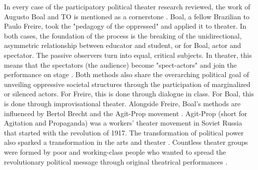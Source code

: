 \documentclass[dissertation,math,vertlayout,pdfa,colorlinks]{aaltoseries}
\begin{document}
In every case of the participatory political theater research reviewed, the work of Augusto Boal and TO \cite{boalTheatreOppressed2008} is mentioned as a cornerstone \cite{pierseCreativelyConnectingCivil2020,epskampTheatreDevelopmentIntroduction2006, tselikaConflictTransformationArt2019, matarassoRestlessArt2019}. Boal, a fellow Brazilian to Paulo Freire, took the "pedagogy of the oppressed" and applied it to theater. In both cases, the foundation of the process is the breaking of the unidirectional, asymmetric relationship between educator and student, or for Boal, actor and spectator. The passive observers turn into equal, critical subjects.  In theater, this means that the spectators (the audience) become "spect-actors" and join the performance on stage \cite{boalTheatreOppressed2008}. Both methods also share the overarching political goal of unveiling oppressive societal structures through the participation of marginalized or silenced actors. For Freire, this is done through dialogue in class. For Boal, this is done through improvisational theater. Alongside Freire, Boal's methods are influenced by Bertol Brecht and the Agit-Prop movement \cite[p.91]{friedmanPerformanceActivismPrecursors2021}. Agit-Prop (short for Agitation
and Propaganda) was a workers' theater movement in Soviet Russia that started with the revolution of 1917. The transformation of political power also sparked a transformation in the arts and theater \cite[p.97]{fischer-lichteTheatreSacrificeRitual2007}. Countless theater groups were formed by poor and working-class people who wanted to spread the revolutionary political message through original theatrical performances \cite[p. 17]{friedmanPerformanceActivismPrecursors2021}.
\end{document}
